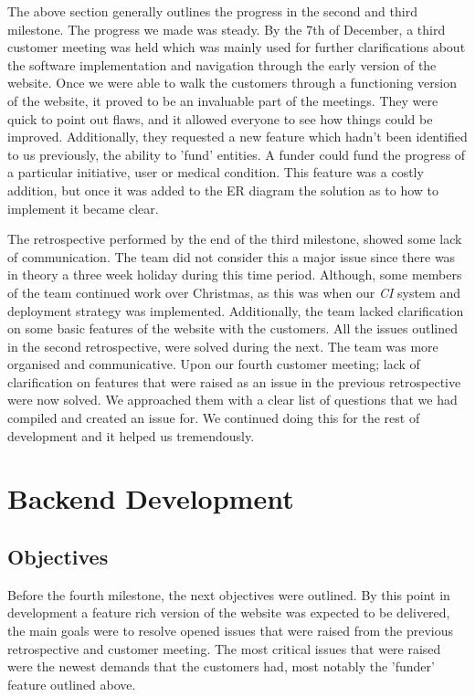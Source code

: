 \documentclass{l3proj}
\begin{document}
The above section generally outlines the progress in the second and third milestone. The progress we made was steady. By the 7th of December, a third customer meeting was held which was mainly used for further clarifications about the software implementation and navigation through the early version of the website. Once we were able to walk the customers through a functioning version of the website, it proved to be an invaluable part of the meetings. They were quick to point out flaws, and it allowed everyone to see how things could be improved. Additionally, they requested a new feature which hadn't been identified to us previously, the ability to 'fund' entities. A funder could fund the progress of a particular initiative, user or medical condition. This feature was a costly addition, but once it was added to the ER diagram the solution as to how to implement it became clear.

The retrospective performed by the end of the third milestone, showed some lack of communication. The team did not consider this a major issue since there was in theory a three week holiday during this time period. Although, some members of the team continued work over Christmas, as this was when our \textit{CI} system and deployment strategy was implemented. Additionally, the team lacked clarification on some basic features of the website with the customers. All the issues outlined in the second retrospective, were solved during the next. The team was more organised and communicative. Upon our fourth customer meeting; lack of clarification on features that were raised as an issue in the previous retrospective were now solved. We approached them with a clear list of questions that we had compiled and created an issue for. We continued doing this for the rest of development and it helped us tremendously.

\section{Backend Development}
\label{sec:backend}

\subsection{Objectives}
\label{sec:backend-objectives}

Before the fourth milestone, the next objectives were outlined. By this point in development a feature rich version of the website was expected to be delivered, the main goals were to resolve opened issues that were raised from the previous retrospective and customer meeting. The most critical issues that were raised were the newest demands that the customers had, most notably the 'funder' feature outlined above.
\end{document}

